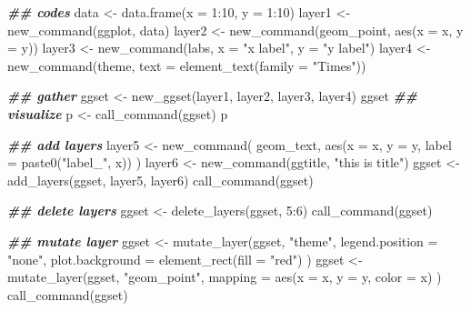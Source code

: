 \documentclass[
]{article}
\newenvironment{Shaded}{\begin{snugshade}}{\end{snugshade}}
\newcommand{\AttributeTok}[1]{\textcolor[rgb]{0.77,0.63,0.00}{#1}}
\newcommand{\DecValTok}[1]{\textcolor[rgb]{0.00,0.00,0.81}{#1}}
\newcommand{\DocumentationTok}[1]{\textcolor[rgb]{0.56,0.35,0.01}{\textbf{\textit{#1}}}}
\newcommand{\FunctionTok}[1]{\textcolor[rgb]{0.00,0.00,0.00}{#1}}
\newcommand{\NormalTok}[1]{#1}
\newcommand{\OtherTok}[1]{\textcolor[rgb]{0.56,0.35,0.01}{#1}}
\newcommand{\SpecialCharTok}[1]{\textcolor[rgb]{0.00,0.00,0.00}{#1}}
\newcommand{\StringTok}[1]{\textcolor[rgb]{0.31,0.60,0.02}{#1}}
\begin{document}
\begin{Shaded}
\begin{Highlighting}[]
\DocumentationTok{\#\# codes}
\NormalTok{data }\OtherTok{\textless{}{-}} \FunctionTok{data.frame}\NormalTok{(}\AttributeTok{x =} \DecValTok{1}\SpecialCharTok{:}\DecValTok{10}\NormalTok{, }\AttributeTok{y =} \DecValTok{1}\SpecialCharTok{:}\DecValTok{10}\NormalTok{)}
\NormalTok{layer1 }\OtherTok{\textless{}{-}} \FunctionTok{new\_command}\NormalTok{(ggplot, data)}
\NormalTok{layer2 }\OtherTok{\textless{}{-}} \FunctionTok{new\_command}\NormalTok{(geom\_point, }\FunctionTok{aes}\NormalTok{(}\AttributeTok{x =}\NormalTok{ x, }\AttributeTok{y =}\NormalTok{ y))}
\NormalTok{layer3 }\OtherTok{\textless{}{-}} \FunctionTok{new\_command}\NormalTok{(labs, }\AttributeTok{x =} \StringTok{"x label"}\NormalTok{, }\AttributeTok{y =} \StringTok{"y label"}\NormalTok{)}
\NormalTok{layer4 }\OtherTok{\textless{}{-}} \FunctionTok{new\_command}\NormalTok{(theme, }\AttributeTok{text =} \FunctionTok{element\_text}\NormalTok{(}\AttributeTok{family =} \StringTok{"Times"}\NormalTok{))}

\DocumentationTok{\#\# gather}
\NormalTok{ggset }\OtherTok{\textless{}{-}} \FunctionTok{new\_ggset}\NormalTok{(layer1, layer2, layer3, layer4)}
\NormalTok{ggset}
\DocumentationTok{\#\# visualize}
\NormalTok{p }\OtherTok{\textless{}{-}} \FunctionTok{call\_command}\NormalTok{(ggset)}
\NormalTok{p}

\DocumentationTok{\#\# add layers}
\NormalTok{layer5 }\OtherTok{\textless{}{-}} \FunctionTok{new\_command}\NormalTok{(}
\NormalTok{  geom\_text,}
  \FunctionTok{aes}\NormalTok{(}\AttributeTok{x =}\NormalTok{ x, }\AttributeTok{y =}\NormalTok{ y, }\AttributeTok{label =} \FunctionTok{paste0}\NormalTok{(}\StringTok{"label\_"}\NormalTok{, x))}
\NormalTok{)}
\NormalTok{layer6 }\OtherTok{\textless{}{-}} \FunctionTok{new\_command}\NormalTok{(ggtitle, }\StringTok{"this is title"}\NormalTok{)}
\NormalTok{ggset }\OtherTok{\textless{}{-}} \FunctionTok{add\_layers}\NormalTok{(ggset, layer5, layer6)}
\FunctionTok{call\_command}\NormalTok{(ggset)}

\DocumentationTok{\#\# delete layers}
\NormalTok{ggset }\OtherTok{\textless{}{-}} \FunctionTok{delete\_layers}\NormalTok{(ggset, }\DecValTok{5}\SpecialCharTok{:}\DecValTok{6}\NormalTok{)}
\FunctionTok{call\_command}\NormalTok{(ggset)}

\DocumentationTok{\#\# mutate layer}
\NormalTok{ggset }\OtherTok{\textless{}{-}} \FunctionTok{mutate\_layer}\NormalTok{(ggset, }\StringTok{"theme"}\NormalTok{,}
  \AttributeTok{legend.position =} \StringTok{"none"}\NormalTok{,}
  \AttributeTok{plot.background =} \FunctionTok{element\_rect}\NormalTok{(}\AttributeTok{fill =} \StringTok{"red"}\NormalTok{)}
\NormalTok{)}
\NormalTok{ggset }\OtherTok{\textless{}{-}} \FunctionTok{mutate\_layer}\NormalTok{(ggset, }\StringTok{"geom\_point"}\NormalTok{,}
  \AttributeTok{mapping =} \FunctionTok{aes}\NormalTok{(}\AttributeTok{x =}\NormalTok{ x, }\AttributeTok{y =}\NormalTok{ y, }\AttributeTok{color =}\NormalTok{ x)}
\NormalTok{)}
\FunctionTok{call\_command}\NormalTok{(ggset)}
\end{Highlighting}
\end{Shaded}
\end{document}
